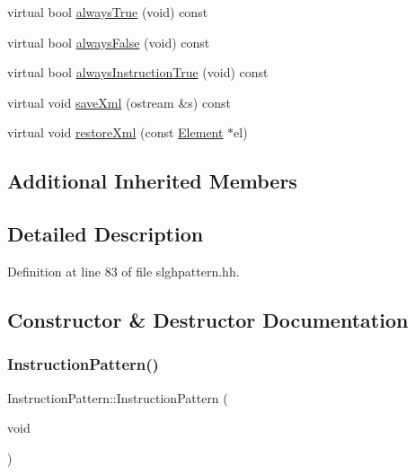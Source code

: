 \begin{DoxyCompactItemize}
virtual bool \mbox{\hyperlink{class_instruction_pattern_a06048b3a010b4822734d34774184f02d}{always\+True}} (void) const
\item 
virtual bool \mbox{\hyperlink{class_instruction_pattern_a0b239a933cc9220adb175d602919986d}{always\+False}} (void) const
\item 
virtual bool \mbox{\hyperlink{class_instruction_pattern_a82ae35b557a32c6f208c6ff19967173b}{always\+Instruction\+True}} (void) const
\item 
virtual void \mbox{\hyperlink{class_instruction_pattern_a355f6e3868e5d1e43b324bdad38e27ed}{save\+Xml}} (ostream \&s) const
\item 
virtual void \mbox{\hyperlink{class_instruction_pattern_adeb7cb99c731f21b58f201972d923ac8}{restore\+Xml}} (const \mbox{\hyperlink{class_element}{Element}} $\ast$el)
\end{DoxyCompactItemize}
\subsection*{Additional Inherited Members}


\subsection{Detailed Description}


Definition at line 83 of file slghpattern.\+hh.



\subsection{Constructor \& Destructor Documentation}
\mbox{\label{class_instruction_pattern_aa0bb8b1282a186a707f4809f8947a17d}} 
\subsubsection{\texorpdfstring{InstructionPattern()}{InstructionPattern()}\hspace{0.1cm}{\footnotesize\ttfamily [1/3]}}
{\footnotesize\ttfamily Instruction\+Pattern\+::\+Instruction\+Pattern (\begin{DoxyParamCaption}\item[{void}]{ }\end{DoxyParamCaption})\hspace{0.3cm}{\ttfamily [inline]}}



